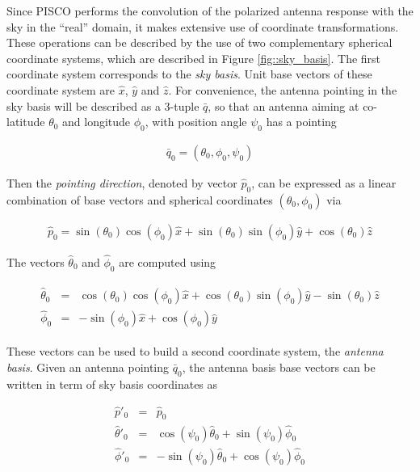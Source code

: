 \documentclass[a4paper,11pt]{article}
\begin{document}
Since PISCO performs the convolution of the polarized antenna response with the sky in the ``real'' domain, it makes extensive use of coordinate transformations. These operations can be described by the use of two complementary spherical coordinate systems, which are described in Figure \ref{fig::sky_basis}. The first coordinate system corresponds to the \textsl{sky basis}. Unit base vectors of these coordinate system are $\hat{x}$, $\hat{y}$ and $\hat{z}$. For convenience, the antenna pointing in the sky basis will be described as a 3-tuple $\bar{q}$, so that an antenna aiming at co-latitude $\theta_0$ and longitude $\phi_0$, with position angle $\psi_0$ has a pointing 

\begin{equation}
\begin{aligned}
\bar{q}_0= (\theta_0,\phi_0,\psi_0)
\end{aligned}
\end{equation}

Then the \textsl{pointing direction}, denoted by vector $\hat{p}_0$, can be expressed as a linear combination of base vectors and spherical coordinates $(\theta_0,\phi_0)$ via

\begin{equation}
\begin{aligned}
\hat{p}_0 = \sin(\theta_0)\cos(\phi_0) \hat{x} + \sin(\theta_0)\sin(\phi_0) \hat{y} + \cos(\theta_0) \hat{z}
\end{aligned}
\label{eq::p_sky_basis}
\end{equation}

The vectors $\hat{\theta}_0$ and $\hat{\phi}_0$ are computed using

\begin{eqnarray}
\begin{aligned}
\hat{\theta}_0 &=&  \cos(\theta_0) \cos(\phi_0) \hat{x} + \cos(\theta_0)\sin(\phi_0) \hat{y} - \sin(\theta_0) \hat{z} \\
\hat{\phi}_0   &=&              -\sin(\phi_0) \hat{x} +             \cos(\phi_0) \hat{y}
\end{aligned}
\label{eq::tangent_sky_basis}
\end{eqnarray}

These vectors can be used to build a second coordinate system, the \textsl{antenna basis}. Given an antenna pointing $\bar{q}_0$, the antenna basis base vectors can be written in term of sky basis coordinates as 

\begin{eqnarray}
\hat{p}'_0      &=&  \hat{p}_0 \\
\hat{\theta}'_0 &=&  \cos(\psi_0)\hat{\theta}_0 + \sin(\psi_0)\hat{\phi}_0 \\
\hat{\phi}'_0   &=& -\sin(\psi_0)\hat{\theta}_0 + \cos(\psi_0)\hat{\phi}_0
\label{eq::antenna_base_vectors}
\end{eqnarray}
\end{document}
